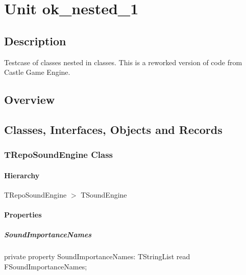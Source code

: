 \documentclass{report}
\begin{document}
\newlength{\tmplength}
\chapter{Unit ok{\_}nested{\_}1}
\section{Description}
Testcase of classes nested in classes. This is a reworked version of code from Castle Game Engine.
\section{Overview}
\begin{description}
\item[\texttt{\begin{ttfamily}TRepoSoundEngine\end{ttfamily} Class}]
\end{description}
\section{Classes, Interfaces, Objects and Records}
\subsection*{TRepoSoundEngine Class}
\subsubsection*{\large{\textbf{Hierarchy}}\normalsize\hspace{1ex}\hfill}
TRepoSoundEngine {$>$} TSoundEngine
\subsubsection*{\large{\textbf{Properties}}\normalsize\hspace{1ex}\hfill}
\paragraph*{SoundImportanceNames}\hspace*{\fill}

\begin{list}{}{
\setlength{\itemindent}{0cm}
\setlength{\listparindent}{0cm}
\setlength{\leftmargin}{\evensidemargin}
\addtolength{\leftmargin}{\tmplength}
\settowidth{\labelsep}{X}
\addtolength{\leftmargin}{\labelsep}
\setlength{\labelwidth}{\tmplength}
}
\begin{flushleft}
\item[\textbf{Declaration}\hfill]
\begin{ttfamily}
private property SoundImportanceNames: TStringList read FSoundImportanceNames;\end{ttfamily}


\end{flushleft}
\end{list}
\end{document}
